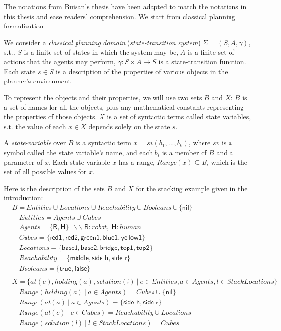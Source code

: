 The notations from Buisan's thesis have been adapted to match the notations in this thesis and ease readers' comprehension. We start from classical planning formalization.

We consider a \textit{classical planning domain} (\textit{state-transition system}) $\Sigma = (S, A,\gamma)$, s.t., $S$ is a finite set of states in which the system may be, $A$ is a finite set of actions that the agents may perform, $\gamma: S \times A \rightarrow S$ is a state-transition function. Each state $s \in S$ is a description of the properties of various objects in the planner's environment~\cite{ghallab2016automated}. 

To represent the objects and their properties, we will use two sets $B$ and $X$: $B$ is a set of names for all the objects, plus any mathematical constants representing the properties of those objects. $X$ is a set of syntactic terms called state variables, s.t. the value of each $x \in X$ depends solely on the state $s$.

A \textit{state-variable} over $B$ is a syntactic term $x = sv(b_1, ..., b_k)$, where $sv$ is a symbol called the state variable's name, and each $b_i$ is a member of $B$ and a parameter of $x$. Each state variable $x$ has a range, $\textit{Range}(x) \subseteq B$, which is the set of all possible values for $x$.


Here is the description of the sets $B$ and $X$ for the stacking example given in the introduction:
{\small
\begin{align*}
&B           = Entities \cup Locations \cup Reachability \cup Booleans \cup \{\textsf{nil}\} \\
&\quad Entities    = Agents \cup Cubes\\
&\quad Agents      = \{ \textsf{R}, \textsf{H} \} ~~ \backslash\backslash~\textsf{R}:robot,~\textsf{H}:human\\
&\quad Cubes     = \{ \textsf{red1}, \textsf{red2}, \textsf{green1}, \textsf{blue1}, \textsf{yellow1} \}\\
&\quad Locations     = \{ \textsf{base1}, \textsf{base2}, \textsf{bridge}, \textsf{top1}, \textsf{top2} \}\\
&\quad Reachability     = \{ \textsf{middle}, \textsf{side\_h}, \textsf{side\_r} \}\\
&\quad Booleans    = \{ \textsf{true},\textsf{false} \}\\
&\\
&X = \{ at(e), holding(a), solution(l) ~ | ~ e \in Entities, a \in Agents, l \in StackLocations\}\\
&\quad \textit{Range}(holding(a) ~|~ a \in Agents) = Cubes \cup \{\textsf{nil}\} \\
&\quad \textit{Range}(at(a) ~|~ a \in Agents) = \{ \textsf{side\_h}, \textsf{side\_r} \}\\
&\quad \textit{Range}(at(c) ~|~ c \in Cubes) = Reachability \cup Locations\\
&\quad \textit{Range}(solution(l) ~|~ l \in StackLocations) = Cubes \\
\end{align*}
}

